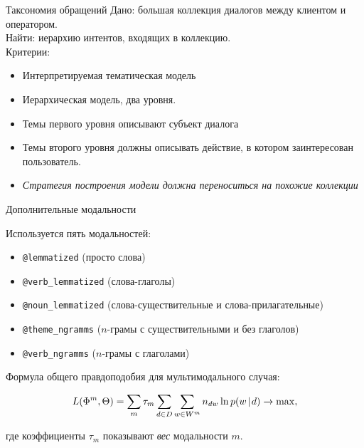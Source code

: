 

\begin{frame}{Таксономия обращений}
	Дано: большая коллекция диалогов между клиентом и оператором.\\
	
	Найти: иерархию интентов, входящих в коллекцию. \\
	
	Критерии: \begin{itemize}
	    \item Интерпретируемая тематическая модель
	    \item Иерархическая модель, два уровня.
	    \item  Темы первого уровня описывают субъект диалога
	    \item  Темы второго уровня должны описывать действие, в котором заинтересован пользователь.
	    \item  \emph{Стратегия построения модели должна переноситься на похожие коллекции}
	\end{itemize}

\end{frame}

\begin{frame}{Дополнительные модальности}


Используется пять модальностей:
\begin{itemize}
    \item \texttt{@lemmatized} (просто слова)
    \item \texttt{@verb\_lemmatized} (слова-глаголы)
    \item \texttt{@noun\_lemmatized} (слова-существительные и слова-прилагательные)
    \item \texttt{@theme\_ngramms} ($n$-грамы с существительными и без глаголов)
    \item \texttt{@verb\_ngramms} ($n$-грамы с глаголами)
\end{itemize}


\bigskip
Формула общего правдоподобия для мультимодального случая:

\[
L(\Phi^m, \Theta) = \sum_m \tau_m \sum_{d\in D} \sum_{w \in W^m} n_{dw} \ln p(w \mspace{2mu}{|}\mspace{2mu} d) \rightarrow \max, 
\]

где коэффициенты $\tau_m$ показывают \textit{вес} модальности $m$. 



\end{frame}


